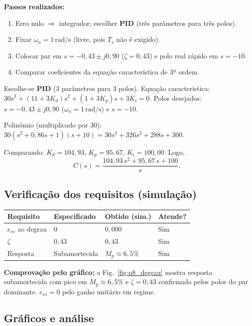 \documentclass[11pt,a4paper]{article}
\begin{document}
\textbf{Passos realizados:}
\begin{enumerate}[leftmargin=*]
  \item Erro nulo $\Rightarrow$ integrador; escolher \textbf{PID} (três
        parâmetros para três polos).
  \item Fixar $\omega_n=1\,\mathrm{rad/s}$ (livre, pois $T_s$ não é exigido).
  \item Colocar par em $s=-0{,}43\pm j0{,}90$ ($\zeta=0{,}43$) e polo real
        rápido em $s=-10$.
  \item Comparar coeficientes da equação característica de 3ª ordem.
\end{enumerate}

Escolhe-se \textbf{PID} (3 parâmetros para 3 polos). Equação característica:
$30s^3+(11+3K_d)s^2+(1+3K_p)s+3K_i=0$. Polos desejados:
$s=-0{,}43\pm j0{,}90$ ($\omega_n=1\,\mathrm{rad/s}$) e $s=-10$.

Polinômio (multiplicado por 30):
$30(s^2+0{,}86s+1)(s+10)=30s^3+326s^2+288s+300$.

Comparando: $K_d=104{,}93$, $K_p=95{,}67$, $K_i=100{,}00$. Logo,
\[
  C(s)=\frac{104{,}93\,s^2+95{,}67\,s+100}{s}.
\]

\subsection*{Verificação dos requisitos (simulação)}

\begin{center}
\small
\begin{tabular}{@{}llll@{}}
  \toprule
  Requisito & Especificado & Obtido (sim.) & Atende? \\
  \midrule
  $e_{ss}$ ao degrau & $0$ & $0{,}000$ & Sim \\
  $\zeta$ & $0{,}43$ & $0{,}43$ & Sim \\
  Resposta & Subamortecida & $M_p\approx 6{,}5\%$ & Sim \\
  \bottomrule
\end{tabular}
\end{center}

\textbf{Comprovação pelo gráfico:} a Fig.~\ref{fig:q8_degrau} mostra resposta
subamortecida com pico em $M_p\approx 6{,}5\%$ e $\zeta=0{,}43$ confirmado
pelos polos do par dominante. $e_{ss}=0$ pelo ganho unitário em regime.

\subsection*{Gráficos e análise}
\end{document}
